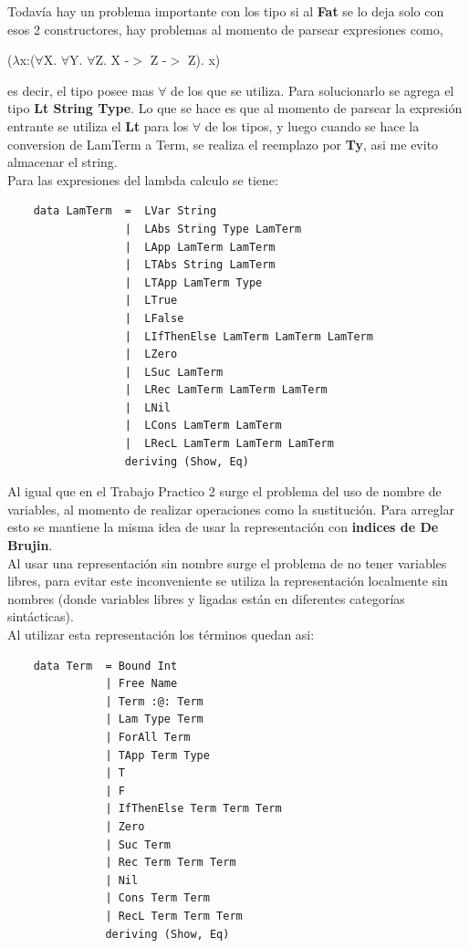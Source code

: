 \documentclass[12pt, titlepage, a4paper]{article}
\begin{document}
  Todavía hay un problema importante con los tipo si al \textbf{Fat} se lo deja solo con esos 2 constructores, hay problemas al momento de parsear 
  expresiones como,

  \begin{center}
    ($\lambda$x:($\forall$X. $\forall$Y. $\forall$Z. X -$>$ Z -$>$ Z). x)
  \end{center}  

  es decir, el tipo posee mas $\forall$ de los que se utiliza. Para solucionarlo se agrega el tipo \textbf{Lt String Type}. Lo que se hace es que 
  al momento de parsear la expresión entrante se utiliza el \textbf{Lt} para los $\forall$ de los tipos, y luego cuando se hace la conversion de 
  LamTerm a Term, se realiza el reemplazo por \textbf{Ty}, asi me evito almacenar el string.\\


\noindent Para las expresiones del lambda calculo se tiene:
\begin{verbatim}
    data LamTerm  =  LVar String
                  |  LAbs String Type LamTerm
                  |  LApp LamTerm LamTerm
                  |  LTAbs String LamTerm
                  |  LTApp LamTerm Type
                  |  LTrue 
                  |  LFalse
                  |  LIfThenElse LamTerm LamTerm LamTerm
                  |  LZero
                  |  LSuc LamTerm
                  |  LRec LamTerm LamTerm LamTerm
                  |  LNil
                  |  LCons LamTerm LamTerm
                  |  LRecL LamTerm LamTerm LamTerm
                  deriving (Show, Eq)
\end{verbatim}

Al igual que en el Trabajo Practico 2 \cite{tp2:lambdaCalculoSimpleTipado} surge el problema del uso de nombre de variables, al 
momento de realizar operaciones como la sustitución. Para arreglar esto se mantiene la misma idea de 
usar la representación con \textbf{indices de De Brujin}. \\

Al usar una representación sin nombre surge el problema de no tener variables libres,  
para evitar este inconveniente se utiliza la representación localmente sin nombres (donde variables libres y ligadas están 
en diferentes categorías sintácticas). \\

\noindent Al utilizar esta representación los términos quedan asi:
\begin{verbatim}
    data Term  = Bound Int
               | Free Name 
               | Term :@: Term
               | Lam Type Term
               | ForAll Term
               | TApp Term Type
               | T
               | F
               | IfThenElse Term Term Term
               | Zero
               | Suc Term
               | Rec Term Term Term
               | Nil
               | Cons Term Term
               | RecL Term Term Term
               deriving (Show, Eq)
\end{verbatim}
\end{document}
